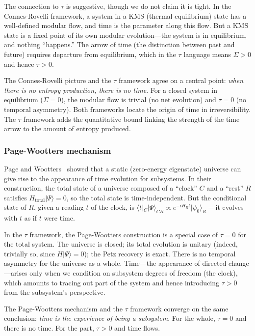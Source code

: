 \documentclass[12pt]{article}
\theoremstyle{definition}
\theoremstyle{remark}
\newcommand{\ket}[1]{|#1\rangle}
\newcommand{\bra}[1]{\langle#1|}
\newcommand{\tauasym}{\tau}
\begin{document}
The connection to $\tauasym$ is suggestive, though we do not
claim it is tight.  In the Connes-Rovelli framework, a system
in a KMS (thermal equilibrium) state has a well-defined modular
flow, and time is the parameter along this flow.  But a KMS
state is a fixed point of its own modular evolution---the system
is in equilibrium, and nothing ``happens.''  The arrow of time
(the distinction between past and future) requires departure
from equilibrium, which in the $\tauasym$ language means
$\Sigma > 0$ and hence $\tauasym > 0$.

The Connes-Rovelli picture and the $\tauasym$ framework agree on
a central point: \emph{when there is no entropy production, there
is no time}.  For a closed system in equilibrium ($\Sigma = 0$),
the modular flow is trivial (no net evolution) and $\tauasym = 0$
(no temporal asymmetry).  Both frameworks locate the origin of
time in irreversibility.  The $\tauasym$ framework adds the
quantitative bound linking the strength of the time arrow to the
amount of entropy produced.

\subsubsection{Page-Wootters mechanism}

Page and Wootters~\cite{Page1983} showed that a static
(zero-energy eigenstate) universe can give rise to the appearance
of time evolution for subsystems.  In their construction, the
total state of a universe composed of a ``clock'' $C$ and a
``rest'' $R$ satisfies $H_{\text{total}}\ket{\Psi} = 0$, so
the total state is time-independent.  But the conditional state
of $R$, given a reading $t$ of the clock, is
$\bra{t}_C\ket{\Psi}_{CR} \propto e^{-iH_R t}\ket{\psi_0}_R$
---it evolves with $t$ as if $t$ were time.

In the $\tauasym$ framework, the Page-Wootters construction is
a special case of $\tauasym = 0$ for the total system.  The
universe is closed; its total evolution is unitary (indeed,
trivially so, since $H\ket{\Psi} = 0$); the Petz recovery is
exact.  There is no temporal asymmetry for the universe as a
whole.  Time---the appearance of directed change---arises only
when we condition on subsystem degrees of freedom (the clock),
which amounts to tracing out part of the system and hence
introducing $\tauasym > 0$ from the subsystem's perspective.

The Page-Wootters mechanism and the $\tauasym$ framework converge
on the same conclusion: \emph{time is the experience of being a
subsystem}.  For the whole, $\tauasym = 0$ and there is no time.
For the part, $\tauasym > 0$ and time flows.
\end{document}
